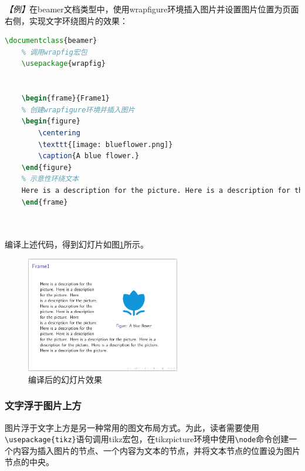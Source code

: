 \emph{【例】}在beamer文档类型中，使用wrapfigure环境插入图片并设置图片位置为页面右侧，实现文字环绕图片的效果：
\begin{lstlisting}[language=TeX]
    \documentclass{beamer}
    % 调用wrapfig宏包
    \usepackage{wrapfig}

    
    \begin{frame}{Frame1}
    % 创建wrapfigure环境并插入图片
    \begin{figure}
        \centering
        \texttt{[image: blueflower.png]}
        \caption{A blue flower.}
    \end{figure}
    % 示意性环绕文本
    Here is a description for the picture. Here is a description for the picture. Here is a description for the picture. Here is a description for the picture. Here is a description for the picture. Here is a description for the picture. Here is a description for the picture. Here is a description for the picture. Here is a description for the picture. Here is a description for the picture. Here is a description for the picture. Here is a description for the picture.
    \end{frame}

    
\end{lstlisting}

编译上述代码，得到幻灯片如图\ref{fig:947}所示。

\begin{figure}[htbp]
    \centering
    \includegraphics[width = 0.6\textwidth]{images/ch_9/eg6_7.png}
    \caption{编译后的幻灯片效果}
    \label{fig:947}
\end{figure}

\subsubsection{文字浮于图片上方}

图片浮于文字上方是另一种常用的图文布局方式。为此，读者需要使用\texttt{\textbackslash{}usepackage\{tikz\}}语句调用tikz宏包，在tikzpicture环境中使用\texttt{\textbackslash{}node}命令创建一个内容为插入图片的节点、一个内容为文本的节点，并将文本节点的位置设为图片节点的中央。

